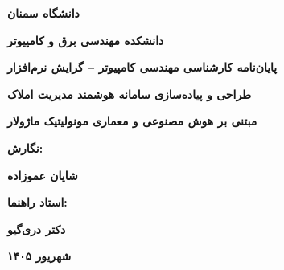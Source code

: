 \documentclass[11pt, a4paper]{report}
\makeatletter
\let\amlak@tabular\tabular
\let\amlak@iitabular\@tabular
\let\amlak@endtabular\endtabular
\let\amlak@array\@array
\let\amlak@endarray\endarray
\let\amlak@arraycr\@arraycr
\let\amlak@tabularcr\@tabularcr
\let\amlak@xtabularcr\@xtabularcr
\let\amlak@hline\hline
\let\tabular\amlak@tabular
\let\@tabular\amlak@iitabular
\let\endtabular\amlak@endtabular
\let\@array\amlak@array
\let\endarray\amlak@endarray
\let\@arraycr\amlak@arraycr
\let\@tabularcr\amlak@tabularcr
\let\@xtabularcr\amlak@xtabularcr
\let\hline\amlak@hline
\makeatother
\begin{document}
\makeatletter
\let\tabular\amlak@tabular
\let\@tabular\amlak@iitabular
\let\endtabular\amlak@endtabular
\let\@array\amlak@array
\let\endarray\amlak@endarray
\let\@arraycr\amlak@arraycr
\let\@tabularcr\amlak@tabularcr
\let\@xtabularcr\amlak@xtabularcr
\let\hline\amlak@hline
\makeatother


\begin{titlepage}
    \centering
    \vspace*{0.5cm}

    \begin{figure}[h]
      \centering
    \end{figure}
    \vspace{0.3cm}
    {\LARGE \bfseries دانشگاه سمنان \par}
    \vspace{0.5cm}
    {\large \bfseries دانشکده مهندسی برق و کامپیوتر \par}
    \vspace{1.5cm}
    {\normalsize \bfseries پایان‌نامه کارشناسی مهندسی کامپیوتر -- گرایش نرم‌افزار \par}
    \vspace{1.8cm}
    {\huge \bfseries طراحی و پیاده‌سازی سامانه هوشمند مدیریت املاک \par}
    \vspace{0.4cm}
    {\large \bfseries مبتنی بر هوش مصنوعی و معماری مونولیتیک ماژولار \par}
    \vspace{2.2cm}
    {\normalsize \bfseries نگارش: \par}
    {\Large \bfseries شایان عموزاده \par}
    \vspace{1.5cm}
    {\normalsize \bfseries استاد راهنما: \par}
    {\Large \bfseries دکتر دری‌گیو \par}
    \vfill
    {\normalsize \bfseries شهریور ۱۴۰۵ \par}
\end{titlepage}
\end{document}
